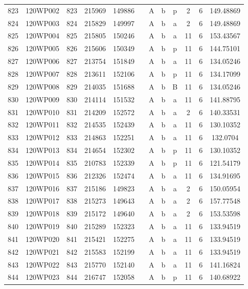 \begin{tabular}{|*{12}{c|}}
823 & 120WP002 & 823 & 215969 & 149886 &  & A & b & p & 2 & 6 & 149.48869 \\ 
824 & 120WP003 & 824 & 215829 & 149997 &  & A & b & a & 2 & 6 & 149.48869 \\ 
825 & 120WP004 & 825 & 215805 & 150246 &  & A & b & a & 11 & 6 & 153.43567 \\ 
826 & 120WP005 & 826 & 215606 & 150349 &  & A & b & p & 11 & 6 & 144.75101 \\ 
827 & 120WP006 & 827 & 213754 & 151849 &  & A & b & a & 11 & 6 & 134.05246 \\ 
828 & 120WP007 & 828 & 213611 & 152106 &  & A & b & p & 11 & 6 & 134.17099 \\ 
829 & 120WP008 & 829 & 214035 & 151688 &  & A & b & B & 11 & 6 & 134.05246 \\ 
830 & 120WP009 & 830 & 214114 & 151532 &  & A & b & a & 11 & 6 & 141.88795 \\ 
831 & 120WP010 & 831 & 214209 & 152572 &  & A & b & a & 2 & 6 & 140.33531 \\ 
832 & 120WP011 & 832 & 214535 & 152439 &  & A & b & a & 11 & 6 & 130.10352 \\ 
833 & 120WP012 & 833 & 214863 & 152251 &  & A & b & a & 11 & 6 & 132.0704 \\ 
834 & 120WP013 & 834 & 214654 & 152302 &  & A & b & p & 11 & 6 & 130.10352 \\ 
835 & 120WP014 & 835 & 210783 & 152339 &  & A & b & p & 11 & 6 & 121.54179 \\ 
836 & 120WP015 & 836 & 212326 & 152474 &  & A & b & a & 11 & 6 & 134.91695 \\ 
837 & 120WP016 & 837 & 215186 & 149823 &  & A & b & a & 2 & 6 & 150.05954 \\ 
838 & 120WP017 & 838 & 215273 & 149643 &  & A & b & a & 2 & 6 & 157.77548 \\ 
839 & 120WP018 & 839 & 215172 & 149640 &  & A & b & a & 2 & 6 & 153.53598 \\ 
840 & 120WP019 & 840 & 215289 & 152323 &  & A & b & a & 11 & 6 & 133.94519 \\ 
841 & 120WP020 & 841 & 215421 & 152275 &  & A & b & a & 11 & 6 & 133.94519 \\ 
842 & 120WP021 & 842 & 215583 & 152199 &  & A & b & a & 11 & 6 & 133.94519 \\ 
843 & 120WP022 & 843 & 215770 & 152140 &  & A & b & a & 11 & 6 & 141.16824 \\ 
844 & 120WP023 & 844 & 216747 & 152058 &  & A & b & p & 11 & 6 & 140.68922 \\ 

\end{tabular}
